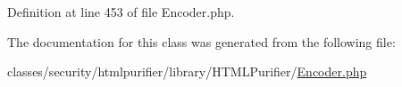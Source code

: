 Definition at line 453 of file Encoder.\+php.



The documentation for this class was generated from the following file\+:\begin{DoxyCompactItemize}
\item 
classes/security/htmlpurifier/library/\+H\+T\+M\+L\+Purifier/\hyperlink{Encoder_8php}{Encoder.\+php}\end{DoxyCompactItemize}
